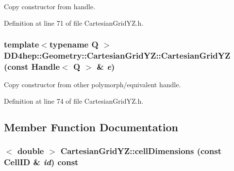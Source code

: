 Copy constructor from handle. 

Definition at line 71 of file CartesianGridYZ.h.\hypertarget{class_d_d4hep_1_1_geometry_1_1_cartesian_grid_y_z_a5b249688197afc0b14a2ec083d0a9b1f}{
\subsubsection[{CartesianGridYZ}]{\setlength{\rightskip}{0pt plus 5cm}template$<$typename Q $>$ DD4hep::Geometry::CartesianGridYZ::CartesianGridYZ (const {\bf Handle}$<$ Q $>$ \& {\em e})}}
\label{class_d_d4hep_1_1_geometry_1_1_cartesian_grid_y_z_a5b249688197afc0b14a2ec083d0a9b1f}


Copy constructor from other polymorph/equivalent handle. 

Definition at line 74 of file CartesianGridYZ.h.

\subsection{Member Function Documentation}
\hypertarget{class_d_d4hep_1_1_geometry_1_1_cartesian_grid_y_z_ad977bcb19f482630f8bb3081fc4e6656}{
\subsubsection[{cellDimensions}]{$<$ double $>$ CartesianGridYZ::cellDimensions (const CellID \& {\em id}) const}}
\label{class_d_d4hep_1_1_geometry_1_1_cartesian_grid_y_z_ad977bcb19f482630f8bb3081fc4e6656}


